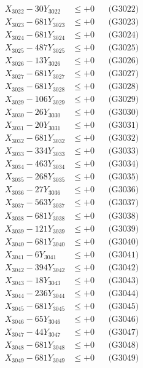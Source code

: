\documentclass[a4paper,10pt]{article}
\begin{document}
{\begin{align}
X_{3022} - 30Y_{3022} &\leq +0 && \text{(G3022)} \\
X_{3023} - 681Y_{3023} &\leq +0 && \text{(G3023)} \\
X_{3024} - 681Y_{3024} &\leq +0 && \text{(G3024)} \\
X_{3025} - 487Y_{3025} &\leq +0 && \text{(G3025)} \\
X_{3026} - 13Y_{3026} &\leq +0 && \text{(G3026)} \\
X_{3027} - 681Y_{3027} &\leq +0 && \text{(G3027)} \\
X_{3028} - 681Y_{3028} &\leq +0 && \text{(G3028)} \\
X_{3029} - 106Y_{3029} &\leq +0 && \text{(G3029)} \\
X_{3030} - 26Y_{3030} &\leq +0 && \text{(G3030)} \\
\allowbreak
X_{3031} - 20Y_{3031} &\leq +0 && \text{(G3031)} \\
X_{3032} - 681Y_{3032} &\leq +0 && \text{(G3032)} \\
X_{3033} - 334Y_{3033} &\leq +0 && \text{(G3033)} \\
X_{3034} - 463Y_{3034} &\leq +0 && \text{(G3034)} \\
X_{3035} - 268Y_{3035} &\leq +0 && \text{(G3035)} \\
X_{3036} - 27Y_{3036} &\leq +0 && \text{(G3036)} \\
X_{3037} - 563Y_{3037} &\leq +0 && \text{(G3037)} \\
X_{3038} - 681Y_{3038} &\leq +0 && \text{(G3038)} \\
X_{3039} - 121Y_{3039} &\leq +0 && \text{(G3039)} \\
X_{3040} - 681Y_{3040} &\leq +0 && \text{(G3040)} \\
\allowbreak
X_{3041} - 6Y_{3041} &\leq +0 && \text{(G3041)} \\
X_{3042} - 394Y_{3042} &\leq +0 && \text{(G3042)} \\
X_{3043} - 18Y_{3043} &\leq +0 && \text{(G3043)} \\
X_{3044} - 236Y_{3044} &\leq +0 && \text{(G3044)} \\
X_{3045} - 681Y_{3045} &\leq +0 && \text{(G3045)} \\
X_{3046} - 65Y_{3046} &\leq +0 && \text{(G3046)} \\
X_{3047} - 44Y_{3047} &\leq +0 && \text{(G3047)} \\
X_{3048} - 681Y_{3048} &\leq +0 && \text{(G3048)} \\
X_{3049} - 681Y_{3049} &\leq +0 && \text{(G3049)} \\

\end{align}}
\end{document}
